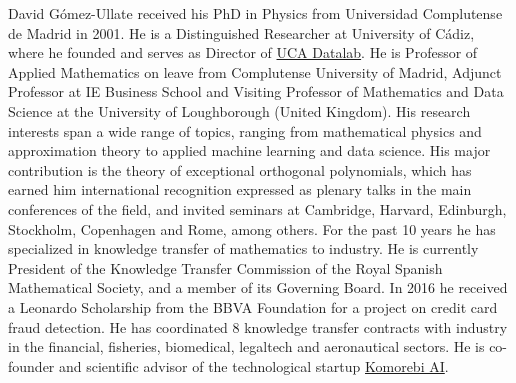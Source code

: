 \documentclass{ieeeaccess}
\begin{document}
\begin{IEEEbiography}{David G\'omez-Ullate} received his PhD in Physics from Universidad Complutense de Madrid in 2001. He is a Distinguished Researcher at University of Cádiz, where he founded and serves as Director of \href{http://datalab.uca.es/}{UCA Datalab}. He is Professor of Applied Mathematics on leave from Complutense University of Madrid, Adjunct Professor at IE Business School and Visiting Professor of Mathematics and Data Science at the University of Loughborough (United Kingdom). 
His research interests span a wide range of topics, ranging from mathematical physics and approximation theory to applied machine learning and data science. His major contribution is the theory of exceptional orthogonal polynomials, which has earned him international recognition expressed as plenary talks in the main conferences of the field, and invited seminars at Cambridge, Harvard, Edinburgh, Stockholm, Copenhagen and Rome, among others. For the past 10 years he has specialized in knowledge transfer of mathematics to industry. He is currently President of the Knowledge Transfer Commission of the Royal Spanish Mathematical Society, and a member of its Governing Board. In 2016 he received a Leonardo Scholarship from the BBVA Foundation for a project on credit card fraud detection.  He has coordinated 8 knowledge transfer contracts with industry in the financial, fisheries, biomedical, legaltech and aeronautical sectors. He is co-founder and scientific advisor of the technological startup \href{https://komorebi.ai/}{Komorebi AI}.
\end{IEEEbiography}
\EOD
\end{document}
